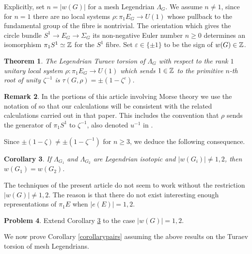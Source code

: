 \documentclass[11pt]{article}
\numberwithin{equation}{section}\providecommand{\dpl}{\displaystyle}
\theoremstyle{plain}
\newtheorem{theorem}{Theorem}[section]
\newtheorem{corollary}[theorem]{Corollary}
\theoremstyle{definition}
\newtheorem{problem}[theorem]{Problem}
\newtheorem{remark}[theorem]{Remark}
\let\ve\varepsilon
\begin{document}
Explicitly, set $n=|w(G)|$ for a mesh Legendrian $\Lambda_G$. We assume $n \neq 1$, since for $n=1$ there are no local systems $\rho: \pi_1 E_G \to U(1)$ whose pullback to the fundamental group of the fibre is nontrivial. The orientation which gives the circle bundle $S^1 \to E_G \to \Sigma_G$ its non-negative Euler number $n \geq 0$ determines an isomorphism $\pi_1S^1 \simeq \mathbb{Z}$ for the $S^1$ fibre. Set $\ve \in \{ \pm 1 \}$ to be the sign of $w(G) \in \mathbb{Z}$.

\begin{theorem}\label{calculation} The Legendrian Turaev torsion of $\Lambda_G$ with respect to the rank $1$ unitary local system $\rho:\pi_1E_G \to U(1)$ which sends $1 \in \mathbb{Z}$ to the primitive $n$-th root of unity $\zeta^{-1}$ is $\tau(G, \rho)=\pm(1-\zeta^\ve)$.
\end{theorem}

\begin{remark}\label{rem: notation of IK}
In the portions of this article involving Morse theory we use the notation of \cite{IK93} so that our calculations will be consistent with the related calculations carried out in that paper. This includes the convention that $\rho$ sends the generator of $\pi_1S^1$ to $\zeta^{-1}$, also denoted $u^{-1}$ in \cite{IK93}.
\end{remark}

Since $\pm(1-\zeta) \neq \pm(1-\zeta^{-1})$ for $n \geq 3$, we deduce the following consequence.

\begin{corollary}\label{turaev}
If $\Lambda_{G_1}$ and $\Lambda_{G_2}$ are Legendrian isotopic and $|w(G_i)| \neq 1,2$, then $w(G_1)=w(G_2)$.
\end{corollary}

The techniques of the present article do not seem to work without the restriction $|w(G)|\neq 1,2$. The reason is that there do not exist interesting enough representations of $\pi_1E$ when $|e(E)| = 1,2$.

\begin{problem}
Extend Corollary \ref{turaev} to the case $|w(G)|=1,2$.
\end{problem}

We now prove Corollary \ref{corollarypairs} assuming the above results on the Turaev torsion of mesh Legendrians.
\end{document}
